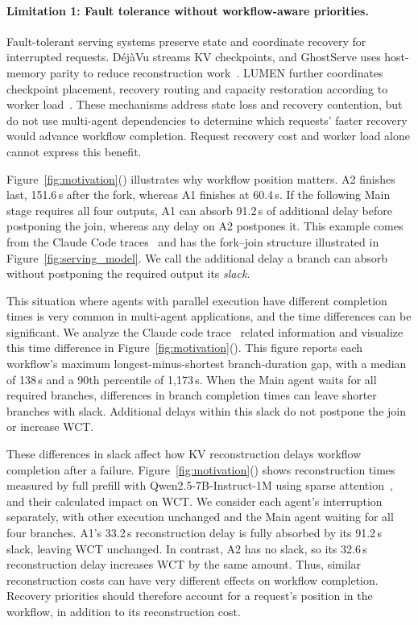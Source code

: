 \paragraph{Limitation 1: Fault tolerance without workflow-aware priorities.}
Fault-tolerant serving systems preserve state and coordinate recovery
for interrupted requests. D\'ej\`aVu streams KV checkpoints, and GhostServe
uses host-memory parity to reduce reconstruction
work~\cite{strati2024dejavu,jayakody2026ghostserve}.
LUMEN further coordinates checkpoint placement, recovery routing and
capacity restoration according to worker load~\cite{cao2026lumen}.
These mechanisms address state loss and recovery contention, but do not
use multi-agent dependencies to determine which requests' faster
recovery would advance workflow completion. Request recovery cost and
worker load alone cannot express this benefit.

\label{sec:motivation-workflow}
Figure~\ref{fig:motivation}() illustrates
why workflow position matters. A2 finishes last, 151.6\,s after the fork,
whereas A1 finishes at 60.4\,s. If the following Main stage requires all
four outputs, A1 can absorb 91.2\,s of additional delay before postponing
the join, whereas any delay on A2 postpones it. This example comes from the Claude Code traces~\cite{semianalysis2026cctraces} and has the fork--join structure illustrated in Figure~\ref{fig:serving_model}. We call the additional
delay a branch can absorb without postponing the required output its
\emph{slack}. 

This situation where agents with parallel execution have different completion times is very common in multi-agent applications, and the time differences can be significant. We analyze the Claude code trace~\cite{semianalysis2026cctraces} related information and visualize this time difference in Figure~\ref{fig:motivation}().
This figure reports each workflow's maximum longest-minus-shortest branch-duration gap,
with a median of 138\,s and a 90th percentile of 1,173\,s. When the Main agent waits for all required branches, differences in branch completion times can leave shorter branches with slack. Additional delays within this slack do not postpone the join or
increase WCT.

These differences in slack affect how KV reconstruction delays workflow
completion after a failure.
Figure~\ref{fig:motivation}()
shows reconstruction times measured by full prefill with
Qwen2.5-7B-Instruct-1M using sparse
attention~\cite{qwen2025qwen25oneM,jiang2024minference},
and their calculated impact on WCT.
We consider each agent's interruption separately, with other execution
unchanged and the Main agent waiting for all four branches.
A1's 33.2\,s reconstruction delay is fully absorbed by its 91.2\,s slack,
leaving WCT unchanged. In contrast, A2 has no slack, so its 32.6\,s
reconstruction delay increases WCT by the same amount.
Thus, similar reconstruction costs can have very different effects
on workflow completion. Recovery priorities should therefore account
for a request's position in the workflow, in addition to its
reconstruction cost.

